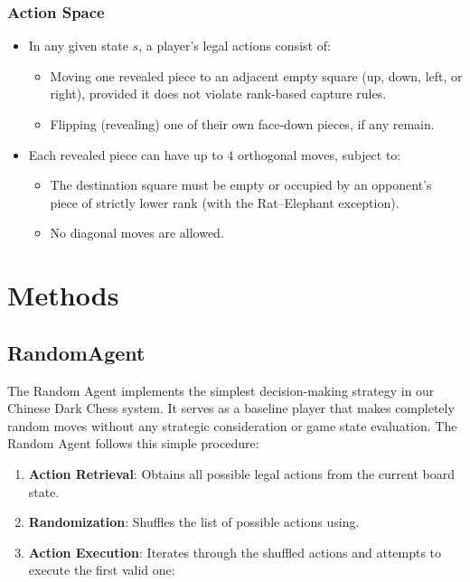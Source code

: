 \documentclass{article}
\begin{document}
\subsubsection{Action Space}
\begin{itemize}
    \item In any given state \(s\), a player’s legal actions consist of:
    \begin{itemize}
      \item Moving one revealed piece to an adjacent empty square (up, down, left, or right), provided it does not violate rank‐based capture rules.
      \item Flipping (revealing) one of their own face‐down pieces, if any remain.
    \end{itemize}
    \item Each revealed piece can have up to 4 orthogonal moves, subject to:
    \begin{itemize}
      \item The destination square must be empty or occupied by an opponent’s piece of strictly lower rank (with the Rat–Elephant exception).
      \item No diagonal moves are allowed.
    \end{itemize}
\end{itemize}


\section{Methods}


\subsection{RandomAgent}
The Random Agent implements the simplest decision-making strategy in our Chinese Dark Chess system. It serves as a baseline player that makes completely random moves without any strategic consideration or game state evaluation.
The Random Agent follows this simple procedure:
\begin{enumerate}
    \item \textbf{Action Retrieval}: Obtains all possible legal actions from the current board state.
    \item \textbf{Randomization}: Shuffles the list of possible actions using.
    \item \textbf{Action Execution}: Iterates through the shuffled actions and attempts to execute the first valid one:
\end{enumerate}
\end{document}
